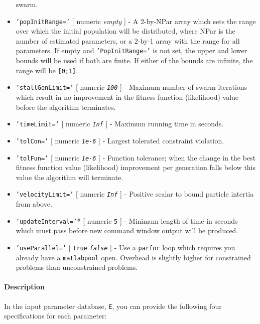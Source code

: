 \begin{itemize}
   swarm.
 \item
   \texttt{'popInitRange='} {[} numeric \textbar{} \emph{empty} {]} - A
   2-by-NPar array which sets the range over which the initial population
   will be distributed, where NPar is the number of estimated parameters,
   or a 2-by-1 array with the range for all parameters. If empty and
   \texttt{'PopInitRange='} is not set, the upper and lower bounds will
   be used if both are finite. If either of the bounds are infinite, the
   range will be \texttt{{[}0;1{]}}.
 \item
   \texttt{'stallGenLimit='} {[} numeric \textbar{} \emph{\texttt{100}}
   {]} - Maximum number of swarm iterations which result in no
   improvement in the fitness function (likelihood) value before the
   algorithm terminates.
 \item
   \texttt{'timeLimit='} {[} numeric \textbar{} \emph{\texttt{Inf}} {]} -
   Maximum running time in seconds.
 \item
   \texttt{'tolCon='} {[} numeric \textbar{} \emph{\texttt{1e-6}} {]} -
   Largest tolerated constraint violation.
 \item
   \texttt{'tolFun='} {[} numeric \textbar{} \emph{\texttt{1e-6}} {]} -
   Function tolerance; when the change in the best fitness function value
   (likelihood) improvement per generation falls below this value the
   algorithm will terminate.
 \item
   \texttt{'velocityLimit='} {[} numeric \textbar{} \emph{\texttt{Inf}}
   {]} - Positive scalar to bound particle intertia from above.
 \item
   \texttt{'updateInterval='}* {[} numeric \textbar{} \texttt{5} {]} -
   Minimum length of time in seconds which must pass before new command
   window output will be produced.
 \item
   \texttt{'useParallel='} {[} \texttt{true} \textbar{}
   \emph{\texttt{false}} {]} - Use a \texttt{parfor} loop which requires
   you already have a \texttt{matlabpool} open. Overhead is slightly
   higher for constrained problems than unconstrained problems.
 \end{itemize}
 
 \paragraph{Description}
 
 In the input parameter database, \texttt{E}, you can provide the
 following four specifications for each parameter:
 
